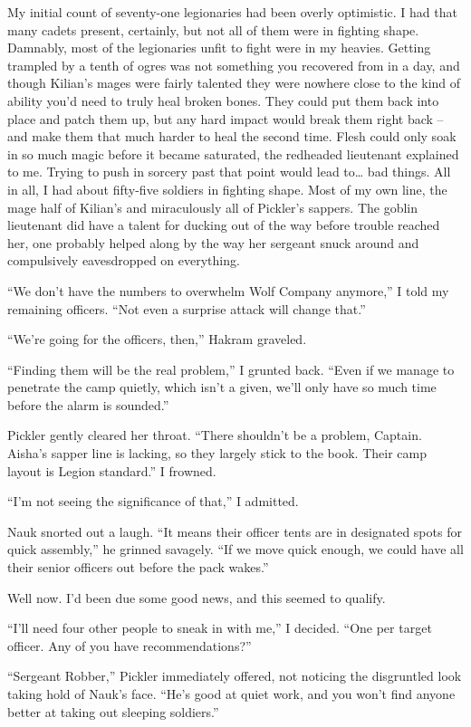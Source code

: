 \documentclass[12pt, openany]{book}
\begin{document}
My initial count of seventy-one legionaries had been overly optimistic. I had that many cadets present, certainly, but not all of them were in fighting shape. Damnably, most of the legionaries unfit to fight were in my heavies. Getting trampled by a tenth of ogres was not something you recovered from in a day, and though Kilian’s mages were fairly talented they were nowhere close to the kind of ability you’d need to truly heal broken bones. They could put them back into place and patch them up, but any hard impact would break them right back – and make them that much harder to heal the second time. Flesh could only soak in so much magic before it became saturated, the redheaded lieutenant explained to me. Trying to push in sorcery past that point would lead to… bad things. All in all, I had about fifty-five soldiers in fighting shape. Most of my own line, the mage half of Kilian’s and miraculously all of Pickler’s sappers. The goblin lieutenant did have a talent for ducking out of the way before trouble reached her, one probably helped along by the way her sergeant snuck around and compulsively eavesdropped on everything.

“We don’t have the numbers to overwhelm Wolf Company anymore,” I told my remaining officers. “Not even a surprise attack will change that.”

“We’re going for the officers, then,” Hakram graveled.

“Finding them will be the real problem,” I grunted back. “Even if we manage to penetrate the camp quietly, which isn’t a given, we’ll only have so much time before the alarm is sounded.”

Pickler gently cleared her throat. “There shouldn’t be a problem, Captain. Aisha’s sapper line is lacking, so they largely stick to the book. Their camp layout is Legion standard.”
I frowned.

“I’m not seeing the significance of that,” I admitted.

Nauk snorted out a laugh. “It means their officer tents are in designated spots for quick assembly,” he grinned savagely. “If we move quick enough, we could have all their senior officers out before the pack wakes.”

Well now. I’d been due some good news, and this seemed to qualify.

“I’ll need four other people to sneak in with me,” I decided. “One per target officer. Any of you have recommendations?”

“Sergeant Robber,” Pickler immediately offered, not noticing the disgruntled look taking hold of Nauk’s face. “He’s good at quiet work, and you won’t find anyone better at taking out sleeping soldiers.”
\end{document}

